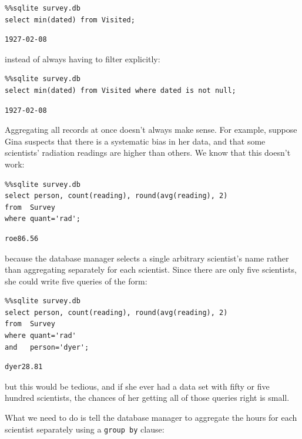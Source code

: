 \documentclass[]{book}
\begin{document}
\begin{verbatim}
%%sqlite survey.db
select min(dated) from Visited;
\end{verbatim}

\begin{verbatim}
1927-02-08
\end{verbatim}

instead of always having to filter explicitly:

\begin{verbatim}
%%sqlite survey.db
select min(dated) from Visited where dated is not null;
\end{verbatim}

\begin{verbatim}
1927-02-08
\end{verbatim}

Aggregating all records at once doesn't always make sense. For example,
suppose Gina suspects that there is a systematic bias in her data, and
that some scientists' radiation readings are higher than others. We know
that this doesn't work:

\begin{verbatim}
%%sqlite survey.db
select person, count(reading), round(avg(reading), 2)
from  Survey
where quant='rad';
\end{verbatim}

\begin{verbatim}
roe86.56
\end{verbatim}

because the database manager selects a single arbitrary scientist's name
rather than aggregating separately for each scientist. Since there are
only five scientists, she could write five queries of the form:

\begin{verbatim}
%%sqlite survey.db
select person, count(reading), round(avg(reading), 2)
from  Survey
where quant='rad'
and   person='dyer';
\end{verbatim}

\begin{verbatim}
dyer28.81
\end{verbatim}

but this would be tedious, and if she ever had a data set with fifty or
five hundred scientists, the chances of her getting all of those queries
right is small.

What we need to do is tell the database manager to aggregate the hours
for each scientist separately using a \texttt{group by} clause:
\end{document}

